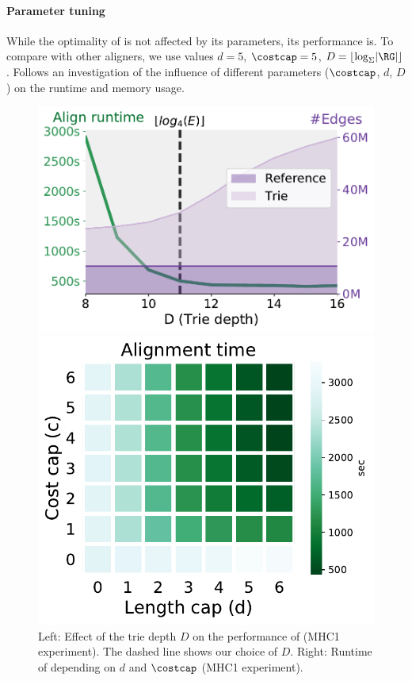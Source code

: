 \paragraph{Parameter tuning} \label{TRIEsubsec:parameter_estimation}

While the optimality of \astarix is not affected by its parameters, its
performance is. To compare with other aligners, we use values \mbox{$d=5$},
\mbox{$\costcap=5$}, \mbox{$D = \lfloor \log_\Sigma \lvert \RG \rvert \rfloor$}.
Follows an investigation of the influence of different parameters ($\costcap$,
$d$, $D$) on the runtime and memory usage.

\begin{figure}[t]
	\centering
	\begin{minipage}{0.45\linewidth}
		\centering
		\includegraphics[width=\linewidth]{figs/trie/MHC1-trie-vs-D.pdf}
		\caption[Performance for various trie depths and heuristic parameters]{Left: Effect of the trie depth $D$ on the performance of \astarix (MHC1 experiment). The dashed line shows our choice of $D$. Right: Runtime of \astarix depending on $d$ and $\costcap$ (MHC1 experiment).}
		\label{TRIEfig:trie_vs_D}
	\end{minipage}%
	\begin{minipage}{0.45\linewidth}
		\centering
		\includegraphics[width=0.8\linewidth]{figs/heuristic/MHC1-heatmap-c_vs_d-align_sec.pdf}

\end{minipage}
\end{figure}

